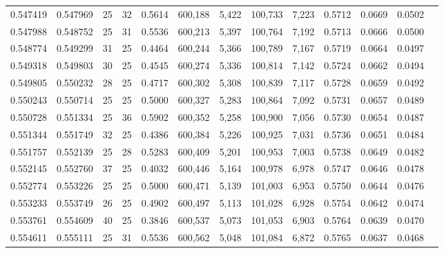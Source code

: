 \begin{tabular}{rrrrrrrrrrrrr}
0.547419 & 0.547969 &    25 &  32 &                                     0.5614 & 600,188 &   5,422 & 100,733 &   7,223 & 0.5712 & 0.0669 & 0.0502 \\
0.547988 & 0.548752 &    25 &  31 &                                     0.5536 & 600,213 &   5,397 & 100,764 &   7,192 & 0.5713 & 0.0666 & 0.0500 \\
0.548774 & 0.549299 &    31 &  25 &                                     0.4464 & 600,244 &   5,366 & 100,789 &   7,167 & 0.5719 & 0.0664 & 0.0497 \\
0.549318 & 0.549803 &    30 &  25 &                                     0.4545 & 600,274 &   5,336 & 100,814 &   7,142 & 0.5724 & 0.0662 & 0.0494 \\
0.549805 & 0.550232 &    28 &  25 &                                     0.4717 & 600,302 &   5,308 & 100,839 &   7,117 & 0.5728 & 0.0659 & 0.0492 \\
0.550243 & 0.550714 &    25 &  25 &                                     0.5000 & 600,327 &   5,283 & 100,864 &   7,092 & 0.5731 & 0.0657 & 0.0489 \\
0.550728 & 0.551334 &    25 &  36 &                                     0.5902 & 600,352 &   5,258 & 100,900 &   7,056 & 0.5730 & 0.0654 & 0.0487 \\
0.551344 & 0.551749 &    32 &  25 &                                     0.4386 & 600,384 &   5,226 & 100,925 &   7,031 & 0.5736 & 0.0651 & 0.0484 \\
0.551757 & 0.552139 &    25 &  28 &                                     0.5283 & 600,409 &   5,201 & 100,953 &   7,003 & 0.5738 & 0.0649 & 0.0482 \\
0.552145 & 0.552760 &    37 &  25 &                                     0.4032 & 600,446 &   5,164 & 100,978 &   6,978 & 0.5747 & 0.0646 & 0.0478 \\
0.552774 & 0.553226 &    25 &  25 &                                     0.5000 & 600,471 &   5,139 & 101,003 &   6,953 & 0.5750 & 0.0644 & 0.0476 \\
0.553233 & 0.553749 &    26 &  25 &                                     0.4902 & 600,497 &   5,113 & 101,028 &   6,928 & 0.5754 & 0.0642 & 0.0474 \\
0.553761 & 0.554609 &    40 &  25 &                                     0.3846 & 600,537 &   5,073 & 101,053 &   6,903 & 0.5764 & 0.0639 & 0.0470 \\
0.554611 & 0.555111 &    25 &  31 &                                     0.5536 & 600,562 &   5,048 & 101,084 &   6,872 & 0.5765 & 0.0637 & 0.0468 \\

\end{tabular}
